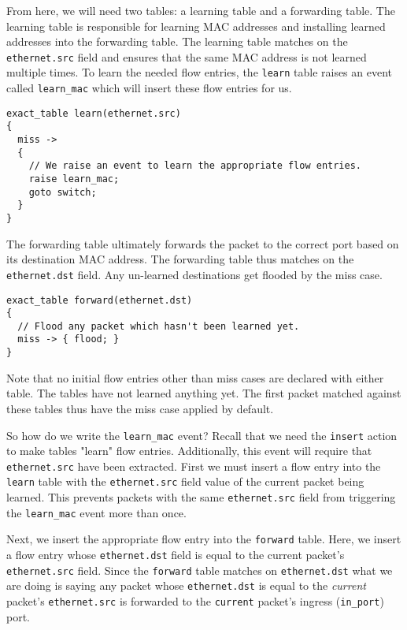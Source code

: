 From here, we will need two tables: a learning table and a forwarding table. The learning table is responsible for learning MAC addresses and installing learned addresses into the forwarding table. The learning table matches on the \texttt{ethernet.src} field and ensures that the same MAC address is not learned multiple times. To learn the needed flow entries, the \texttt{learn} table raises an event called \texttt{learn\_mac} which will insert these flow entries for us.

\begin{lstlisting}
exact_table learn(ethernet.src)
{
  miss ->
  {
  	// We raise an event to learn the appropriate flow entries.
  	raise learn_mac;
    goto switch;
  }
}
\end{lstlisting}

The forwarding table ultimately forwards the packet to the correct port based on its destination MAC address. The forwarding table thus matches on the \texttt{ethernet.dst} field. Any un-learned destinations get flooded by the miss case.

\begin{lstlisting}
exact_table forward(ethernet.dst)
{
  // Flood any packet which hasn't been learned yet.
  miss -> { flood; }
}
\end{lstlisting}

Note that no initial flow entries other than miss cases are declared with either table. The tables have not learned anything yet. The first packet matched against these tables thus have the miss case applied by default.

So how do we write the \texttt{learn\_mac} event? Recall that we need the \texttt{insert} action to make tables "learn" flow entries. Additionally, this event will require that \texttt{ethernet.src} have been extracted. First we must insert a flow entry into the \texttt{learn} table with the \texttt{ethernet.src} field value of the current packet being learned. This prevents packets with the same \texttt{ethernet.src} field from triggering the \texttt{learn\_mac} event more than once. 

Next, we insert the appropriate flow entry into the \texttt{forward} table. Here, we insert a flow entry whose \texttt{ethernet.dst} field is equal to the current packet's \texttt{ethernet.src} field. Since the \texttt{forward} table matches on \texttt{ethernet.dst} what we are doing is saying any packet whose \texttt{ethernet.dst} is equal to the \textit{current} packet's \texttt{ethernet.src} is forwarded to the \texttt{current} packet's ingress (\texttt{in\_port}) port.

